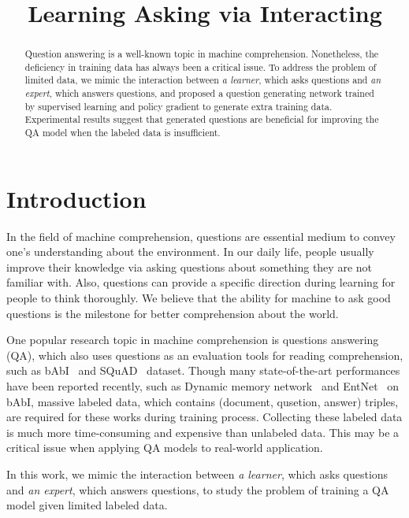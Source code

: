 \documentclass{article}
\title{Learning Asking via Interacting}
\begin{document}
\maketitle
\begin{abstract}
Question answering is a well-known topic in machine comprehension. Nonetheless, the deficiency in training data has always been a critical issue. To address the problem of limited data, we mimic the interaction between \emph{a learner}, which asks questions and \emph{an expert}, which answers questions, and proposed a question generating network trained by supervised learning and policy gradient to generate extra training data. Experimental results suggest that generated questions are beneficial for improving the QA model when the labeled data is insufficient.
\end{abstract}

\section{Introduction}
\label{sec:intro}
In the field of machine comprehension, questions are essential medium to convey one's understanding about the environment. In our daily life, people usually improve their knowledge via asking questions about something they are not familiar with. Also, questions can provide a specific direction during learning for people to think thoroughly. We believe that the ability for machine to ask good questions is the milestone for better comprehension about the world.

One popular research topic in machine comprehension is questions answering (QA), which also uses questions as an evaluation tools for reading comprehension, such as bAbI~\cite{wbcrmjm15:bAbI} and SQuAD~\cite{rzll16:SQuAD} dataset. Though many state-of-the-art performances have been reported recently, such as Dynamic memory network~\cite{koibgzps15:DMN, xms16:DMN+} and EntNet~\cite{hwsbl16:entnet} on bAbI, massive labeled data, which contains (document, qusetion, answer) triples, are required for these works during training process. Collecting these labeled data is much more time-consuming and expensive than unlabeled data. This may be a critical issue when applying QA models to real-world application.

In this work, we mimic the interaction between \emph{a learner}, which asks questions and \emph{an expert}, which answers questions, to study the problem of training a QA model given limited labeled data.%
\end{document}
